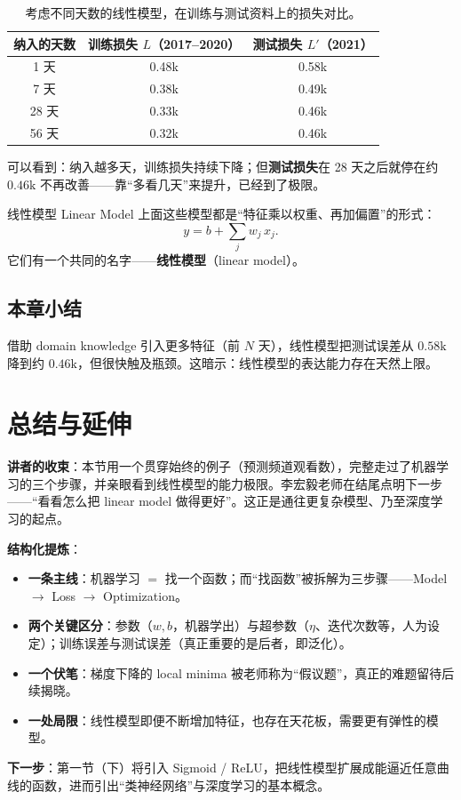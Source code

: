 \documentclass[a4paper]{article}
\begin{document}
\begin{table}[H]
\centering
\begin{tabular}{ccc}
\toprule
纳入的天数 & 训练损失 $L$（2017--2020） & 测试损失 $L'$（2021） \\
\midrule
1 天   & 0.48k & 0.58k \\
7 天   & 0.38k & 0.49k \\
28 天  & 0.33k & 0.46k \\
56 天  & 0.32k & 0.46k \\
\bottomrule
\end{tabular}
\caption{考虑不同天数的线性模型，在训练与测试资料上的损失对比。}
\end{table}

可以看到：纳入越多天，训练损失持续下降；但\textbf{测试损失}在 28 天之后就停在约 $0.46\mathrm{k}$ 不再改善——靠“多看几天”来提升，已经到了极限。

\begin{importantbox}{线性模型 Linear Model}
上面这些模型都是“特征乘以权重、再加偏置”的形式：
$$ y = b + \sum_{j} w_j\,x_j. $$
它们有一个共同的名字——\textbf{线性模型}（linear model）。
\end{importantbox}

\subsection{本章小结}
借助 domain knowledge 引入更多特征（前 $N$ 天），线性模型把测试误差从 $0.58\mathrm{k}$ 降到约 $0.46\mathrm{k}$，但很快触及瓶颈。这暗示：线性模型的表达能力存在天然上限。

\section{总结与延伸}

\textbf{讲者的收束}：本节用一个贯穿始终的例子（预测频道观看数），完整走过了机器学习的三个步骤，并亲眼看到线性模型的能力极限。李宏毅老师在结尾点明下一步——“看看怎么把 linear model 做得更好”。这正是通往更复杂模型、乃至深度学习的起点。

\textbf{结构化提炼}：

\begin{itemize}
    \item \textbf{一条主线}：机器学习 $=$ 找一个函数；而“找函数”被拆解为三步骤——Model $\to$ Loss $\to$ Optimization。
    \item \textbf{两个关键区分}：参数（$w,b$，机器学出）与超参数（$\eta$、迭代次数等，人为设定）；训练误差与测试误差（真正重要的是后者，即泛化）。
    \item \textbf{一个伏笔}：梯度下降的 local minima 被老师称为“假议题”，真正的难题留待后续揭晓。
    \item \textbf{一处局限}：线性模型即便不断增加特征，也存在天花板，需要更有弹性的模型。
\end{itemize}

\textbf{下一步}：第一节（下）将引入 Sigmoid / ReLU，把线性模型扩展成能逼近任意曲线的函数，进而引出“类神经网络”与深度学习的基本概念。

\end{document}
